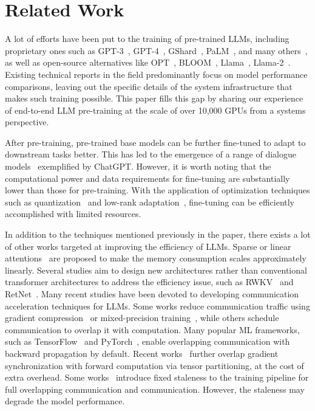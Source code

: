 \section{Related Work}
\label{sec:related}

A lot of efforts have been put to the training of pre-trained LLMs, including
proprietary ones such as GPT-3~\cite{brown2020language},
GPT-4~\cite{openai2023gpt4}, GShard~\cite{lepikhin2020gshard},
PaLM~\cite{chowdhery2022palm}, and many others~\cite{askell2021general,
wei2022finetuned, smith2022using, hoffmann2022training, su2023welm}, as well as
open-source alternatives like OPT~\cite{zhang2022opt},
BLOOM~\cite{scao2022bloom}, Llama~\cite{touvron2023llama1},
Llama-2~\cite{touvron2023llama}. Existing technical reports in the field
predominantly focus on model performance comparisons, leaving out the specific
details of the system infrastructure that makes such training possible.
This paper fills this gap by sharing our experience of end-to-end LLM
pre-training at the scale of over 10,000 GPUs from a systems perspective.

After pre-training, pre-trained base models can be further fine-tuned to adapt
to downstream tasks better. This has led to the emergence of a range of dialogue
models~\cite{alpaca, vicuna2023, koala_blogpost_2023, BELLE} exemplified by
ChatGPT. However, it is worth noting that the computational power and data
requirements for fine-tuning are substantially lower than those for
pre-training. With the application of optimization techniques such as
quantization~\cite{li2020train, xiao2022smoothquant, frantar2022gptq,
dettmers2022llm} and low-rank adaptation~\cite{hu2021lora}, fine-tuning can be
efficiently accomplished with limited resources. 

In addition to the techniques mentioned previously in the paper, there exists a lot of other works targeted at improving the efficiency of LLMs. Sparse or linear attentions~\cite{child2019generating, katharopoulos2020transformers, zhu2021longshort} are proposed to make the memory consumption scales approximately linearly. Several studies
aim to design new architectures rather than conventional
transformer architectures to address the efficiency issue, such as
RWKV~\cite{peng2023rwkv} and RetNet~\cite{sun2023retentive}. 
Many recent studies have been devoted to developing communication acceleration techniques for LLMs. Some works reduce communication traffic using gradient compression~\cite{alistarh2017qsgd} or mixed-precision training~\cite{DBLP:conf/iclr/MicikeviciusNAD18}, while others schedule communication to overlap it with computation. 
Many popular ML frameworks, such as TensorFlow~\cite{abadi2016tensorflow} and PyTorch~\cite{paszke2019pytorch}, enable overlapping communication with backward propagation by default.
Recent works~\cite{jayarajan2019priority, hashemi2019tictac, peng2019generic, bao2020preemptive} further overlap gradient synchronization with forward computation via tensor partitioning, at the cost of extra overhead. Some works~\cite{li2018pipe, chen2022sapipe} introduce fixed staleness to the training pipeline for full overlapping communication and communication. However, the staleness may degrade the model performance.


